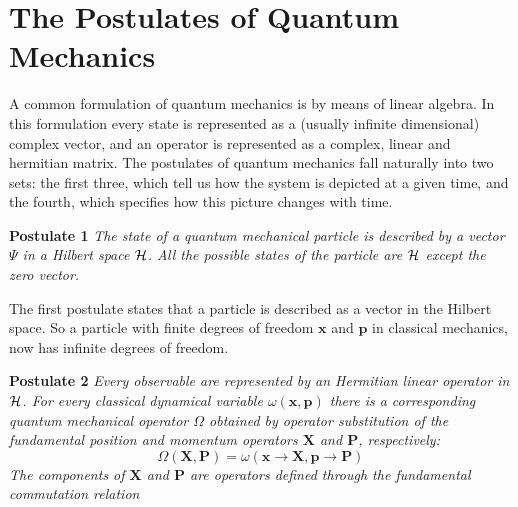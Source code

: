 \section{The Postulates of Quantum Mechanics}

A common formulation of quantum mechanics is by means of linear
algebra. In this formulation every state is represented as a (usually
infinite dimensional) complex vector, and an operator is represented
as a complex, linear and hermitian matrix. 
The postulates of quantum mechanics fall naturally into two sets: the
first three, which tell us how the system is depicted at a given time,
and the fourth, which specifies how this picture changes with time. 
\newline


{\bf \large Postulate 1}
\emph{
The state of a quantum mechanical particle is described by a vector
$\Psi$ in a Hilbert space ${\cal H}$. All the possible states of the
particle are ${\cal H}$ except the zero vector.
\newline
}

The first postulate states that a particle is described as a vector in
the Hilbert space. So a particle with finite degrees of
freedom $\mathbf{x}$ and $\mathbf{p}$ in classical
mechanics, now has infinite degrees of freedom. 
\newline


{\bf \large Postulate 2}
\emph{
Every observable are represented by an Hermitian linear operator in
${\cal H}$. For every classical dynamical variable
$\omega(\mathbf{x},\mathbf{p})$ there is a corresponding quantum
mechanical operator $\Omega$  obtained by operator substitution of the
fundamental position and momentum operators $\mathbf{X}$ and
$\mathbf{P}$, respectively: 
}
%
\begin{equation*}
  \Omega(\mathbf{X},\mathbf{P}) = \omega(\mathbf{x} \to
  \mathbf{X},\mathbf{p} \to \mathbf{P})
\end{equation*}
%
\emph{
The components of $\mathbf{X}$ and $\mathbf{P}$ are operators defined
through the fundamental commutation relation
}

